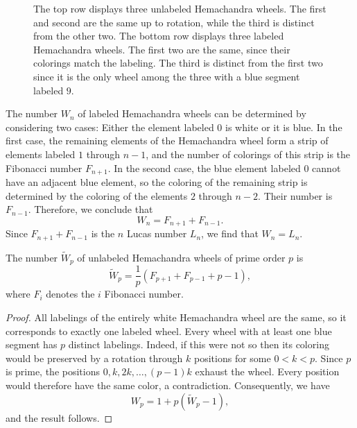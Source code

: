 \begin{figure}[t]
  \caption[Hemachandra wheels]{The top row displays three unlabeled Hemachandra wheels. The first and second are the same up to rotation, while the third is distinct from the other two. The bottom row displays three labeled Hemachandra wheels. The first two are the same, since their colorings match the labeling. The third is distinct from the first two since it is the only wheel among the three with a blue segment labeled $9$.}
  \label{figure:hemachandra-wheels}
\end{figure}

\begin{remark}
  The number $W_n$ of labeled Hemachandra wheels can be determined by considering two cases: Either the element labeled $0$ is white or it is blue. In the first case, the remaining elements of the Hemachandra wheel form a strip of elements labeled $1$ through $n-1$, and the number of colorings of this strip is the Fibonacci number $F_{n+1}$. In the second case, the blue element labeled $0$ cannot have an adjacent blue element, so the coloring of the remaining strip is determined by the coloring of the elements $2$ through $n-2$. Their number is $F_{n-1}$. Therefore, we conclude that
  \begin{equation*}
    W_n=F_{n+1}+F_{n-1}.
  \end{equation*}
  Since $F_{n+1}+F_{n-1}$ is the $n$\supth{} Lucas number $L_n$, we find that $W_n=L_n$.
\end{remark}

\begin{theorem}
  The number $\tilde{W}_p$ of unlabeled Hemachandra wheels of prime order $p$ is  \begin{equation*}
    \tilde{W}_p=\frac{1}{p}(F_{p+1}+F_{p-1}+p-1),
  \end{equation*}
  where $F_i$ denotes the $i$\supth{} Fibonacci number.
\end{theorem}

\begin{proof}
  All labelings of the entirely white Hemachandra wheel are the same, so it corresponds to exactly one labeled wheel. Every wheel with at least one blue segment has $p$ distinct labelings. Indeed, if this were not so then its coloring would be preserved by a rotation through $k$ positions for some $0<k<p$. Since $p$ is prime, the positions $0,k,2k,\ldots,(p-1)k$ exhaust the wheel. Every position would therefore have the same color, a contradiction. Consequently, we have
  \begin{equation*}
    W_p=1+p(\tilde{W}_p-1),
  \end{equation*}
  and the result follows.
\end{proof}

